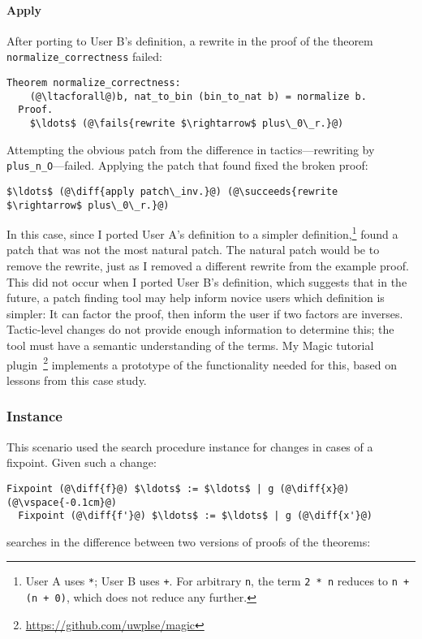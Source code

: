 \paragraph{Apply} After porting to User B's definition, a rewrite in the proof of the theorem
\lstinline{normalize_correctness} failed:

\begin{lstlisting}[language=coq]
  Theorem normalize_correctness:
    (@\ltacforall@)b, nat_to_bin (bin_to_nat b) = normalize b.
  Proof.
    $\ldots$ (@\fails{rewrite $\rightarrow$ plus\_0\_r.}@)
\end{lstlisting}
Attempting the obvious patch from the difference in tactics---rewriting by \lstinline{plus_n_O}---failed.
Applying the patch that \sysname found fixed the broken proof:

\begin{lstlisting}[language=coq]
   $\ldots$ (@\diff{apply patch\_inv.}@) (@\succeeds{rewrite $\rightarrow$ plus\_0\_r.}@)
\end{lstlisting}

In this case, since I ported User A's definition to a simpler 
definition,\footnote{User A uses \lstinline{*}; User B uses \lstinline{+}. 
For arbitrary \lstinline{n}, the term \lstinline{2 * n} reduces to \lstinline{n + (n + 0)}, which does not reduce any further.}
\sysname found a patch that was not the most natural patch.
The natural patch would be to remove the rewrite, just as I removed a different rewrite from the example proof.
This did not occur when I ported User B's definition,
which suggests that in the future, a patch finding tool may help inform novice users which definition is simpler:
It can factor the proof,  
then inform the user if two factors are inverses.
Tactic-level changes do not provide enough information to determine this; the tool must have a semantic
understanding of the terms.
My Magic tutorial plugin~\footnote{\url{https://github.com/uwplse/magic}} %
implements a prototype of the functionality needed for this, based on lessons from this case study.

\subsubsection{Instance}

This scenario used the search procedure instance for changes in cases of a fixpoint.
Given such a change:

\begin{lstlisting}[language=coq]
  Fixpoint (@\diff{f}@) $\ldots$ := $\ldots$ | g (@\diff{x}@)(@\vspace{-0.1cm}@)
  Fixpoint (@\diff{f'}@) $\ldots$ := $\ldots$ | g (@\diff{x'}@)
\end{lstlisting}
\sysname searches in the difference between two versions of proofs of the theorems:

